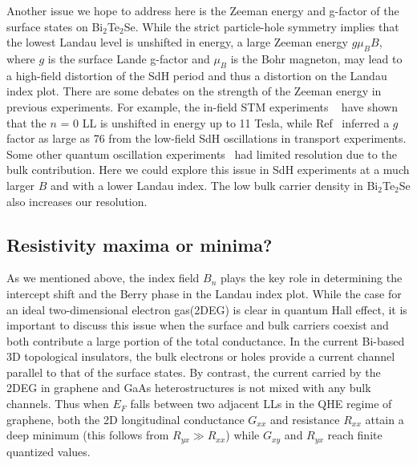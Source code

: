 Another issue we hope to address here is the Zeeman energy and g-factor of the surface states on Bi$_2$Te$_2$Se. While the strict particle-hole symmetry implies that the lowest Landau level is unshifted in energy, a large Zeeman energy $g\mu_BB$, where $g$ is the surface Lande g-factor and $\mu_B$ is the Bohr magneton, may lead to a high-field distortion of the SdH period and thus a distortion on the Landau index plot. There are some debates on the strength of the Zeeman energy in previous experiments. For example, the in-field STM experiments ~\cite{Hanaguri,Xue10} have shown that the $n$ = 0 LL is unshifted in energy up to 11 Tesla, while Ref~\cite{Taskin} inferred a $g$ factor as large as 76 from the low-field SdH oscillations in transport experiments. Some other quantum oscillation experiments~\cite{Qu,Analytis} had limited resolution due to the bulk contribution. Here we could explore this issue in SdH experiments at a much larger $B$ and with a lower Landau index. The low bulk carrier density in Bi$_2$Te$_2$Se also increases our resolution.

\subsection{Resistivity maxima or minima?}\label{maxmin}
As we mentioned above, the index field $B_n$ plays the key role in determining the intercept shift and the Berry phase in the Landau index plot. While the case for an ideal two-dimensional electron gas(2DEG) is clear in quantum Hall effect, it is important to discuss this issue when the surface and bulk carriers coexist and both contribute a large portion of the total conductance. In the current Bi-based 3D topological insulators, the bulk electrons or holes provide a current channel parallel to that of the surface states. By contrast, the current carried by the 2DEG in graphene and GaAs heterostructures is not mixed with any bulk channels. Thus when $E_F$ falls between two adjacent LLs in the QHE regime of graphene, both the 2D longitudinal conductance $G_{xx}$ and resistance $R_{xx}$ attain a deep minimum (this follows from $R_{yx}\gg R_{xx}$) while $G_{xy}$ and $R_{yx}$ reach finite quantized values. 




